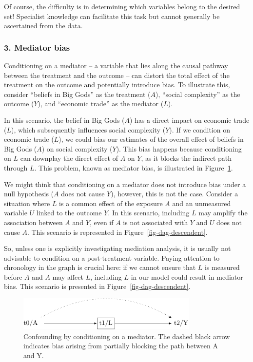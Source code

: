 \documentclass[
  singlecolumn]{article}
\begin{document}
Of course, the difficulty is in determining which variables belong to
the desired set! Specialist knowledge can facilitate this task but
cannot generally be ascertained from the data.

\hypertarget{mediator-bias}{%
\subsubsection{3. Mediator bias}\label{mediator-bias}}

Conditioning on a mediator -- a variable that lies along the causal
pathway between the treatment and the outcome -- can distort the total
effect of the treatment on the outcome and potentially introduce bias.
To illustrate this, consider ``beliefs in Big Gods'' as the treatment
(\(A\)), ``social complexity'' as the outcome (\(Y\)), and ``economic
trade'' as the mediator (\(L\)).

In this scenario, the belief in Big Gods (\(A\)) has a direct impact on
economic trade (\(L\)), which subsequently influences social complexity
(\(Y\)). If we condition on economic trade (\(L\)), we could bias our
estimates of the overall effect of beliefs in Big Gods (\(A\)) on social
complexity (\(Y\)). This bias happens because conditioning on \(L\) can
downplay the direct effect of \(A\) on \(Y\), as it blocks the indirect
path through \(L\). This problem, known as mediator bias, is illustrated
in Figure~\ref{fig-dag-mediator}.

We might think that conditioning on a mediator does not introduce bias
under a null hypothesis (\(A\) does not cause \(Y\)), however, this is
not the case. Consider a situation where \(L\) is a common effect of the
exposure \(A\) and an unmeasured variable \(U\) linked to the outcome
\(Y\). In this scenario, including \(L\) may amplify the association
between \(A\) and \(Y\), even if \(A\) is not associated with \(Y\) and
\(U\) does not cause \(A\). This scenario is represented in
Figure~\ref{fig-dag-descendent}.

So, unless one is explicitly investigating mediation analysis, it is
usually not advisable to condition on a post-treatment variable. Paying
attention to chronology in the graph is crucial here: if we cannot
ensure that \(L\) is measured before \(A\) and \(A\) may affect \(L\),
including \(L\) in our model could result in mediator bias. This
scenario is presented in Figure~\ref{fig-dag-descendent}.

\begin{figure}

{\centering \includegraphics[width=0.8\textwidth,height=\textheight]{causal-dags_files/figure-pdf/fig-dag-mediator-1.pdf}

}

\caption{\label{fig-dag-mediator}Confounding by conditioning on a
mediator. The dashed black arrow indicates bias arising from partially
blocking the path between A and Y.}

\end{figure}
\end{document}
